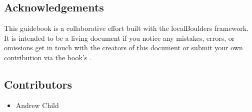 \begin{multicols}{2}
\raggedcolumns

\section{Acknowledgements}
This guidebook is a collaborative effort built with the localBoulders framework. It is intended to be a living document if you notice any mistakes, errors, or omissions get in touch with the creators of this document or submit your own contribution via the book's .
\subsection*{Contributors}
\begin{itemize}
\item Andrew Child
\end{itemize}
\end{multicols}
\clearpage